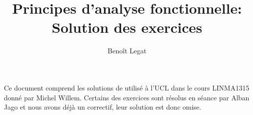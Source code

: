 

\newcommand{\cfrape}[2]{Voir l'exercice~#2 de l'ape~#1}

\newcommand{\nosolution}
{Cet exercice ne contient pas encore de solution.
Vous êtes invité à nous en soumettre une à l'adresse suivante
\begin{center}
\url{https://github.com/blegat/LINMA1315-Sol}
\end{center}
ou par mail.}

\title{Principes d'analyse fonctionnelle: Solution des exercices}
\author{Benoît Legat}


\maketitle

Ce document comprend les solutions de \cite{willem2008principes}
utilisé à l'UCL dans le cours LINMA1315 donné par Michel Willem.
Certains des exercices sont résolus en séance par Alban Jago
et nous avons déjà un correctif, leur solution est donc omise.

